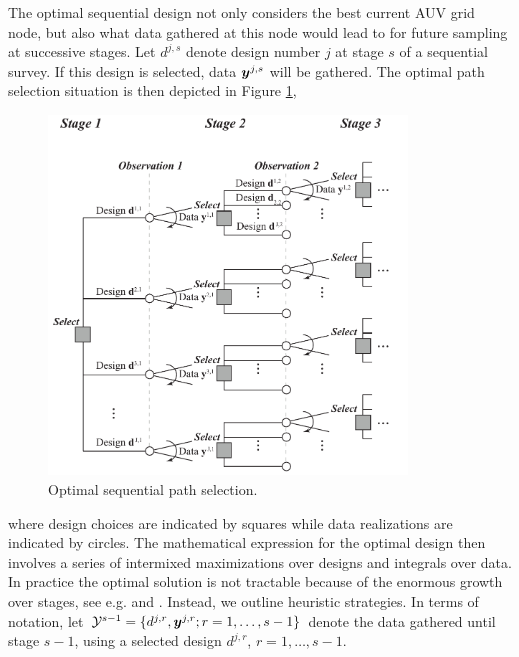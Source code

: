 \documentclass[aoas]{imsart}
\begin{document}
The optimal sequential design not only considers the best current AUV
grid node, but also what data gathered at this node would lead to for
future sampling at successive stages.  Let $d^{j,s}$ denote design
number $j$ at stage $s$ of a sequential survey. If this design is
selected, data ${\boldsymbol y}^{j,s}$ will be gathered. The optimal path
selection situation is then depicted in Figure \ref{fig:PathSelOpt},
\begin{figure}[h!]
\centering
\includegraphics[width=0.85\textwidth]{Figures/sequent_select.pdf}
\caption{Optimal sequential path selection.}\label{fig:PathSelOpt}
\end{figure}
where design choices are indicated by squares while data realizations are indicated by circles. 
The mathematical expression for the optimal design then involves a
series of intermixed maximizations over designs and integrals over
data.  In practice the optimal solution is not tractable because of
the enormous growth over stages, see
e.g. \cite{sucar2015probabilistic} and \cite{powell2016perspectives}.
Instead, we outline heuristic strategies. In terms of notation, let
$\mathcal{Y}^{s-1} =\{d^{j,r}, {\boldsymbol y}^{j,r} ; r=1,\ldots,s-1 \}$ denote
the data gathered until stage $s-1$, using a selected design
$d^{j,r}$, $r=1,\ldots,s-1$.
\end{document}

